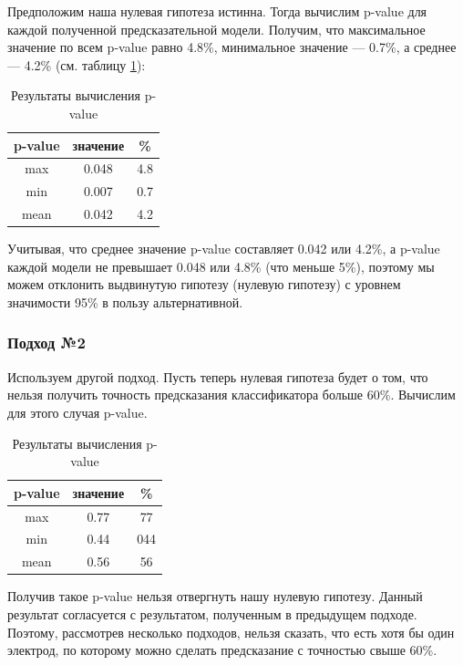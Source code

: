 Предположим наша нулевая гипотеза истинна. Тогда вычислим p-value для
каждой полученной предсказательной модели. Получим, что максимальное значение по всем
p-value равно 4.8\%, минимальное значение --- 0.7\%, а среднее --- 4.2\% (см. таблицу \ref{fig:table_1}):\\[1 mm]

\begin{table}[H]

    \begin{center}
        \caption{Результаты вычисления p-value}
        \begin{tabular}{ | c | c | c |}
            \hline
            p-value & значение & \% \\ \hline
            max & 0.048 & 4.8\\
            min & 0.007 & 0.7 \\
            mean & 0.042 & 4.2\\
            \hline
        \end{tabular}
        \label{fig:table_1}
    \end{center}
\end{table}

Учитывая, что среднее значение p-value составляет 0.042 или 4.2\%, а p-value каждой модели
не превышает 0.048 или 4.8\% (что меньше 5\%), поэтому мы можем отклонить выдвинутую
гипотезу (нулевую гипотезу) с уровнем значимости 95\% в пользу альтернативной.

\subsubsection{Подход №2}
Используем другой подход. Пусть теперь нулевая гипотеза будет о том, что нельзя получить
точность предсказания классификатора больше 60\%. Вычислим для этого случая p-value.

\begin{table}[H]

    \begin{center}
        \caption{Результаты вычисления p-value}
        \begin{tabular}{ | c | c | c |}
            \hline
            p-value & значение & \% \\ \hline
            max & 0.77 & 77\\
            min & 0.44 & 044 \\
            mean & 0.56 & 56\\
            \hline
        \end{tabular}
        \label{fig:table_2}
    \end{center}
\end{table}

Получив такое p-value нельзя отвергнуть нашу нулевую гипотезу. Данный результат согласуется
с результатом, полученным в предыдущем подходе. Поэтому, рассмотрев несколько подходов, нельзя сказать, что есть хотя бы
один электрод, по которому можно сделать предсказание с точностью свыше 60\%.